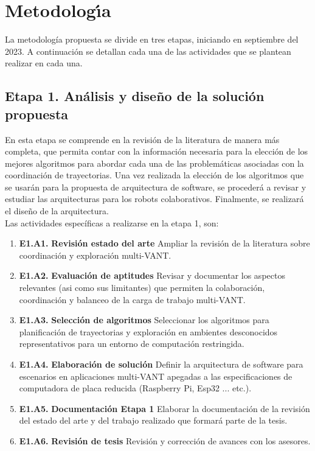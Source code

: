 \documentclass[11pt,epsf,times]{article}
\begin{document}
\newpage
\section*{Metodolog\'{\i}a}

La metodolog\'{i}a propuesta se divide en tres etapas, iniciando en septiembre del 2023. A continuaci\'{o}n se detallan cada una de las actividades que se plantean realizar en cada una.

\subsection*{Etapa 1. An\'{a}lisis y dise\~{n}o de la soluci\'{o}n propuesta}

En esta etapa se comprende en la revisi\'{o}n de la literatura de manera m\'{a}s completa, que permita contar con la informaci\'{o}n necesaria para la elecci\'{o}n de los mejores algoritmos para abordar cada una de las problem\'{a}ticas asociadas con la coordinaci\'{o}n de trayectorias. Una vez realizada la elecci\'{o}n de los algoritmos que se usar\'{a}n para la propuesta de arquitectura de software, se proceder\'{a} a revisar y estudiar las arquitecturas para los robots colaborativos. Finalmente, se realizar\'{a} el dise\~{n}o de la arquitectura.\\

Las actividades espec\'{i}ficas a realizarse en la etapa 1, son:
  
  \begin{enumerate}
  \item[] \textbf{E1.A1.} \textbf{Revisi\'{o}n estado del arte} Ampliar la revisi\'{o}n de la literatura sobre coordinaci\'{o}n y exploraci\'{o}n multi-VANT.
  \item[] \textbf{E1.A2.} \textbf{Evaluaci\'{o}n de aptitudes} Revisar y documentar los aspectos relevantes (asi como sus limitantes) que permiten la colaboraci\'{o}n, coordinaci\'{o}n y balanceo de la carga de trabajo multi-VANT.
  \item[] \textbf{E1.A3.} \textbf{Selecci\'{o}n de algoritmos} Seleccionar los algoritmos para planificaci\'{o}n de trayectorias y exploraci\'{o}n en ambientes desconocidos representativos para un entorno de computaci\'{o}n restringida.
  \item[] \textbf{E1.A4.} \textbf{Elaboraci\'{o}n de soluci\'{o}n} Definir la arquitectura de software para escenarios en aplicaciones multi-VANT apegadas a las especificaciones de computadora de placa reducida (Raspberry Pi, Esp32 ... etc.).
  \item[] \textbf{E1.A5.} \textbf{Documentaci\'{o}n Etapa 1} Elaborar la documentaci\'{o}n de la revisi\'{o}n del estado del arte y del trabajo realizado que formar\'{a} parte de la tesis.
  \item[] \textbf{E1.A6.} \textbf{Revisi\'{o}n de tesis} Revisi\'{o}n y correcci\'{o}n de avances con los asesores.
  \end{enumerate}
  
\end{document}

